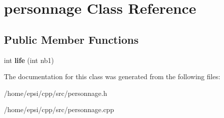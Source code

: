 \hypertarget{classpersonnage}{}\section{personnage Class Reference}
\label{classpersonnage}
\subsection*{Public Member Functions}
\begin{DoxyCompactItemize}
\item 
\mbox{\label{classpersonnage_ab79a9ff0774f7be0b0fc15ffa8ecffb1}} 
int {\bfseries life} (int nb1)
\end{DoxyCompactItemize}


The documentation for this class was generated from the following files\+:\begin{DoxyCompactItemize}
\item 
/home/epsi/cpp/src/personnage.\+h\item 
/home/epsi/cpp/src/personnage.\+cpp\end{DoxyCompactItemize}
